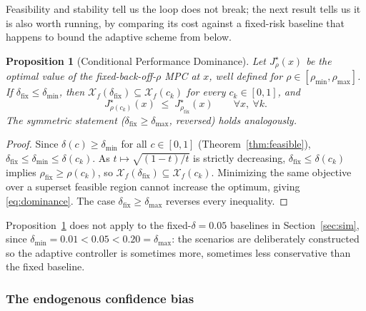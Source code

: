 \documentclass[letterpaper, 10 pt, conference]{ieeeconf}
\newtheorem{proposition}{Proposition}
\begin{document}
Feasibility and stability tell us the loop does not break; the next result tells us it is also worth running, by comparing its cost against a fixed-risk baseline that happens to bound the adaptive scheme from below.

\begin{proposition}[Conditional Performance Dominance]
\label{prop:dominance}
Let $J^\star_\rho(x)$ be the optimal value of the fixed-back-off-$\rho$ MPC at $x$, well defined for $\rho\in[\rho_{\min},\rho_{\max}]$. If $\delta_{\mathrm{fix}}\le\delta_{\min}$, then $\mathcal X_f(\delta_{\mathrm{fix}}) \subseteq \mathcal X_f(c_k)$ for every $c_k\in[0,1]$, and
\begin{equation}
J^\star_{\rho(c_k)}(x) \;\le\; J^\star_{\rho_{\mathrm{fix}}}(x) \qquad \forall x,\ \forall k. \label{eq:dominance}
\end{equation}
The symmetric statement ($\delta_{\mathrm{fix}}\ge\delta_{\max}$, reversed) holds analogously.
\end{proposition}
\begin{proof}
Since $\delta(c)\ge\delta_{\min}$ for all $c\in[0,1]$ (Theorem~\ref{thm:feasible}), $\delta_{\mathrm{fix}}\le\delta_{\min}\le\delta(c_k)$. As $t\mapsto\sqrt{(1-t)/t}$ is strictly decreasing, $\delta_{\mathrm{fix}}\le\delta(c_k)$ implies $\rho_{\mathrm{fix}}\ge\rho(c_k)$, so $\mathcal X_f(\delta_{\mathrm{fix}})\subseteq\mathcal X_f(c_k)$. Minimizing the same objective over a superset feasible region cannot increase the optimum, giving \eqref{eq:dominance}. The case $\delta_{\mathrm{fix}}\ge\delta_{\max}$ reverses every inequality.
\end{proof}

Proposition~\ref{prop:dominance} does not apply to the fixed-$\delta=0.05$ baselines in Section~\ref{sec:sim}, since $\delta_{\min}=0.01<0.05<0.20=\delta_{\max}$: the scenarios are deliberately constructed so the adaptive controller is sometimes more, sometimes less conservative than the fixed baseline.

\subsubsection{The endogenous confidence bias}
\label{sec:bias}
\end{document}
